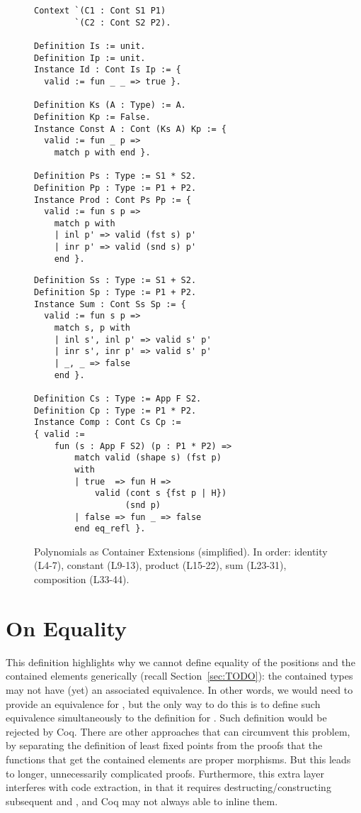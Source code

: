 \documentclass[anonymous, a4paper, UKenglish, cleveref, autoref, thm-restate]{lipics-v2021}
\begin{document}
\begin{figure}
\begin{minipage}{.52\textwidth}
  \begin{verbatim}
Context `(C1 : Cont S1 P1)
        `(C2 : Cont S2 P2).

Definition Is := unit.
Definition Ip := unit.
Instance Id : Cont Is Ip := {
  valid := fun _ _ => true }.

Definition Ks (A : Type) := A.
Definition Kp := False.
Instance Const A : Cont (Ks A) Kp := {
  valid := fun _ p =>
    match p with end }.

Definition Ps : Type := S1 * S2.
Definition Pp : Type := P1 + P2.
Instance Prod : Cont Ps Pp := {
  valid := fun s p =>
    match p with
    | inl p' => valid (fst s) p'
    | inr p' => valid (snd s) p'
    end }.
\end{verbatim}
\end{minipage}
\begin{minipage}{.47\textwidth}
  \begin{verbatim}
Definition Ss : Type := S1 + S2.
Definition Sp : Type := P1 + P2.
Instance Sum : Cont Ss Sp := {
  valid := fun s p =>
    match s, p with
    | inl s', inl p' => valid s' p'
    | inr s', inr p' => valid s' p'
    | _, _ => false
    end }.

Definition Cs : Type := App F S2.
Definition Cp : Type := P1 * P2.
Instance Comp : Cont Cs Cp :=
{ valid :=
    fun (s : App F S2) (p : P1 * P2) =>
        match valid (shape s) (fst p)
        with
        | true  => fun H =>
            valid (cont s {fst p | H})
                  (snd p)
        | false => fun _ => false
        end eq_refl }.
  \end{verbatim}
\end{minipage}
  \caption{Polynomials as Container Extensions (simplified). In order: identity
  (L4-7), constant (L9-13), product (L15-22), sum (L23-31), composition
  (L33-44).}
  \label{fig:poly}
\end{figure}


\section{On Equality}
This definition highlights why we cannot define equality of the positions and
the contained elements generically (recall Section~\ref{sec:TODO}): the
contained types may not have (yet) an associated equivalence. In other words, we
would need to provide an equivalence for , but the only way to do this
is to define such equivalence simultaneously to the definition for  .
Such definition would be rejected by Coq. There are other approaches that can
circumvent this problem, by separating the definition of least fixed points from
the proofs that the functions that get the contained elements are proper
morphisms. But this leads to longer, unnecessarily complicated proofs.
Furthermore, this extra layer interferes with code extraction, in that it
requires destructing/constructing subsequent  and , and Coq
may not always able to inline them.
\end{document}
